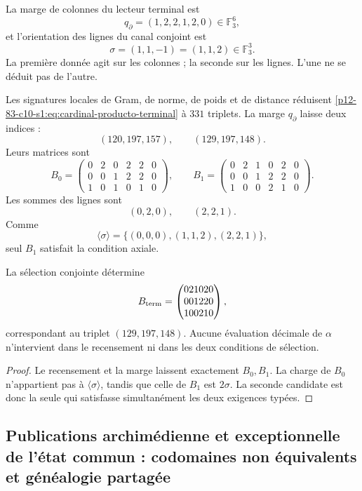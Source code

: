La marge de colonnes du lecteur terminal est
\[
 q_\partial=(1,2,2,1,2,0)\in\mathbb F_3^6,
\]
et l’orientation des lignes du canal conjoint est
\[
 \sigma=(1,1,-1)=(1,1,2)\in\mathbb F_3^3.
\]
La première donnée agit sur les colonnes ; la seconde sur les lignes. L’une ne se déduit pas
de l’autre.

Les signatures locales de Gram, de norme, de poids et de distance réduisent
\eqref{p12-83-c10-s1:eq:cardinal-producto-terminal} à \(331\) triplets. La marge
\(q_\partial\) laisse deux indices :
\[
 (120,197,157),
 \qquad
 (129,197,148).
\]
Leurs matrices sont
\[
 B_0=
 \begin{pmatrix}
 0&2&0&2&2&0\\
 0&0&1&2&2&0\\
 1&0&1&0&1&0
 \end{pmatrix},
 \qquad
 B_1=
 \begin{pmatrix}
 0&2&1&0&2&0\\
 0&0&1&2&2&0\\
 1&0&0&2&1&0
 \end{pmatrix}.
\]
Les sommes des lignes sont
\[
 (0,2,0),
 \qquad
 (2,2,1).
\]
Comme
\[
 \langle\sigma\rangle
 =\{(0,0,0),(1,1,2),(2,2,1)\},
\]
seul \(B_1\) satisfait la condition axiale.

\begin{theorem}
\label{p12-83-c10-s1:thm:unicidad-publicacion-terminal-visible}
La sélection conjointe détermine
\begin{equation}
 B_{\rm term}=
 \begin{pmatrix}
 021020\\001220\\100210
 \end{pmatrix},
 \label{p12-83-c10-s1:eq:matriz-terminal-visible}
\end{equation}
correspondant au triplet \((129,197,148)\). Aucune évaluation décimale de
\(\alpha\) n’intervient dans le recensement ni dans les deux conditions de sélection.
\end{theorem}

\begin{proof}
Le recensement et la marge laissent exactement \(B_0,B_1\). La charge de \(B_0\)
n’appartient pas à \(\langle\sigma\rangle\), tandis que celle de \(B_1\) est
\(2\sigma\). La seconde candidate est donc la seule qui satisfasse
simultanément les deux exigences typées.
\end{proof}

\subsection{Publications archimédienne et exceptionnelle de l'état commun : codomaines non équivalents et généalogie partagée}

